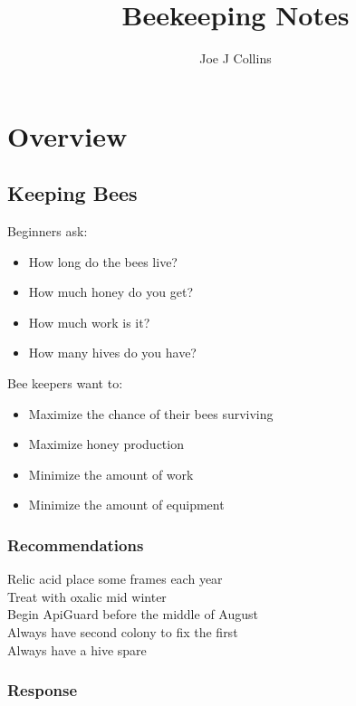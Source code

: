 \documentclass{./BeekeepingBook}
\title{Beekeeping Notes}
\author{Joe J Collins}
\date{\DTMnow}
\begin{document}
 
\maketitle
\tableofcontents

\chapter{Overview}

\section*{Keeping Bees}

Beginners ask:

\begin{itemize}
  \item How long do the bees live?
  \item How much honey do you get?
  \item How much work is it?
  \item How many hives do you have?
\end{itemize}

Bee keepers want to:

\begin{itemize}
  \item Maximize the chance of their bees surviving
  \item Maximize honey production
  \item Minimize the amount of work
  \item Minimize the amount of equipment
\end{itemize}

\subsection*{Recommendations}

\begin{description}
  \item[Relic acid place some frames each year]
  \item[Treat with oxalic mid winter]
  \item[Begin ApiGuard before the middle of August]
  \item[Always have second colony to fix the first]
  \item[Always have a hive spare]
\end{description}

\subsection*{Response}
\end{document}
